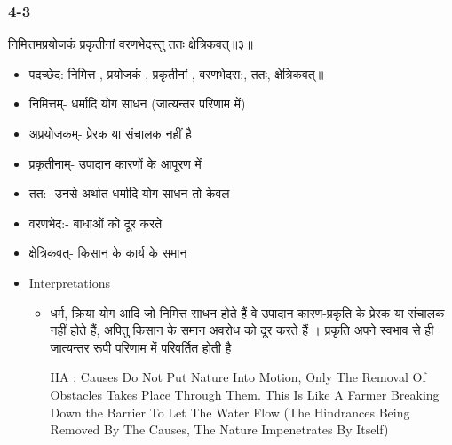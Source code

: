 \begin{frame}[fragile]\frametitle{4-3}
\begin{sanskrit}
निमित्तमप्रयोजकं प्रकृतीनां वरणभेदस्तु ततः क्षेत्रिकवत्॥३॥
\end{sanskrit}

	\begin{itemize}
	\item पदच्छेद:  निमित्त , प्रयोजकं‌ , प्रकृतीनां‌ , वरणभेदस:, ततः‌, क्षेत्रिकवत्‌॥
	\item निमित्तम्- धर्मादि योग साधन (जात्यन्तर परिणाम में)
	\item अप्रयोजकम्- प्रेरक या संचालक नहीं है
	\item प्रकृतीनाम्- उपादान कारणों के आपूरण में
	\item तत:- उनसे अर्थात धर्मादि योग साधन तो केवल
	\item वरणभेद:- बाधाओं को दूर करते
	\item क्षेत्रिकवत्- किसान के कार्य के समान
	\item Interpretations
		\begin{itemize}	
		\item धर्म, क्रिया योग आदि जो निमित्त साधन होते हैं वे उपादान कारण-प्रकृति के प्रेरक या संचालक नहीं होते हैं, अपितु किसान के समान अवरोध को दूर करते हैं । प्रकृति अपने स्वभाव से ही जात्यन्तर रूपी परिणाम में परिवर्तित होती है
		\item [HA]: Causes Do Not Put Nature Into Motion, Only The Removal Of Obstacles Takes Place Through Them. This Is Like A Farmer Breaking Down the Barrier To Let The Water Flow (The Hindrances Being Removed By The Causes, The Nature Impenetrates By Itself)
		\end{itemize}
	\end{itemize}
\end{frame}

